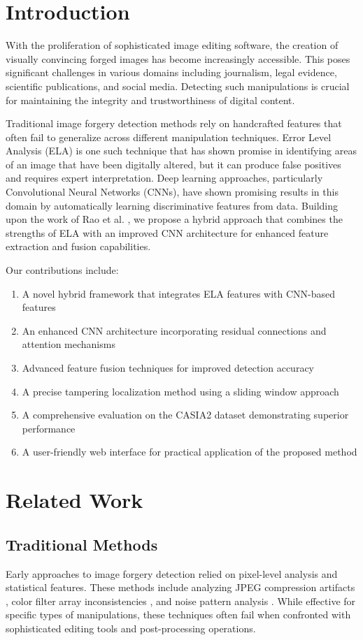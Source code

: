 \documentclass[conference]{IEEEtran}
\begin{document}
\section{Introduction}
With the proliferation of sophisticated image editing software, the creation of visually convincing forged images has become increasingly accessible. This poses significant challenges in various domains including journalism, legal evidence, scientific publications, and social media. Detecting such manipulations is crucial for maintaining the integrity and trustworthiness of digital content.

Traditional image forgery detection methods rely on handcrafted features that often fail to generalize across different manipulation techniques. Error Level Analysis (ELA) is one such technique that has shown promise in identifying areas of an image that have been digitally altered, but it can produce false positives and requires expert interpretation. Deep learning approaches, particularly Convolutional Neural Networks (CNNs), have shown promising results in this domain by automatically learning discriminative features from data. Building upon the work of Rao et al. \cite{rao2016}, we propose a hybrid approach that combines the strengths of ELA with an improved CNN architecture for enhanced feature extraction and fusion capabilities.

Our contributions include:
\begin{enumerate}
    \item A novel hybrid framework that integrates ELA features with CNN-based features
    \item An enhanced CNN architecture incorporating residual connections and attention mechanisms
    \item Advanced feature fusion techniques for improved detection accuracy
    \item A precise tampering localization method using a sliding window approach
    \item A comprehensive evaluation on the CASIA2 dataset demonstrating superior performance
    \item A user-friendly web interface for practical application of the proposed method
\end{enumerate}

\section{Related Work}

\subsection{Traditional Methods}
Early approaches to image forgery detection relied on pixel-level analysis and statistical features. These methods include analyzing JPEG compression artifacts \cite{farid2009}, color filter array inconsistencies \cite{popescu2005}, and noise pattern analysis \cite{johnson2006}. While effective for specific types of manipulations, these techniques often fail when confronted with sophisticated editing tools and post-processing operations.
\end{document}
